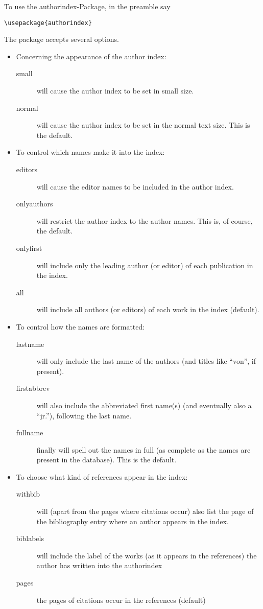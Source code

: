 \documentclass{article}
\newcommand{\authorindex}{\textsf{authorindex}}
\begin{document}
To use the \authorindex-Package, in the preamble say
\begin{verbatim}
\usepackage{authorindex}
\end{verbatim}
The package accepts several options. 
\begin{itemize}
\item Concerning the appearance of the author index:
  \begin{description}
  \item[small] will cause the author index to be set in small size.
  \item[normal] will cause the author index to be set in the normal text size.
    This is the default.
  \end{description}
\item To control which names make it into the index:
  \begin{description}
  \item[editors] will cause the editor names to be included in the author
    index.
  \item[onlyauthors] will restrict the author index to the author names. This
    is, of course, the default.
  \item[onlyfirst] will include only the leading author (or editor) of each
    publication in the index.
  \item[all] will include all authors (or editors) of each work in the index
    (default).
  \end{description}
\item To control how the names are formatted:
  \begin{description}
  \item[lastname] will only include the last name of the authors (and titles
    like ``von'', if present).
  \item[firstabbrev] will also include the abbreviated first name(s) (and
    eventually also a ``jr.''), following the last name.
  \item[fullname] finally will spell out the names in full (as complete as the
    names are present in the database). This is the default.
  \end{description}
\item To choose what kind of references appear in the index:
  \begin{description}
  \item[withbib] will (apart from the pages where citations occur) also list
    the page of the bibliography entry where an author appears in the index.
  \item[biblabels] will include the label of the works (as it appears in the
    references) the author has written into the authorindex
  \item[pages] the pages of citations occur in the references (default)
  \end{description}
\end{itemize}
\end{document}
